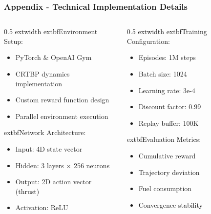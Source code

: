 \documentclass[
    11pt, %
    aspectratio=169, %
]{beamer}
\begin{document}
\begin{frame}[noframenumbering]
\label{Technical Details}
	\frametitle{Appendix - Technical Implementation Details}
	
	\begin{columns}[t]
		\begin{column}{0.5	extwidth}
				extbf{Environment Setup:}
			\begin{itemize}
				\item PyTorch \& OpenAI Gym
				\item CRTBP dynamics implementation
				\item Custom reward function design
				\item Parallel environment execution
			\end{itemize}
			
			\vspace{0.3cm}
			
				extbf{Network Architecture:}
			\begin{itemize}
				\item Input: 4D state vector
				\item Hidden: 3 layers × 256 neurons
				\item Output: 2D action vector (thrust)
				\item Activation: ReLU
			\end{itemize}
		\end{column}
		\begin{column}{0.5	extwidth}
				extbf{Training Configuration:}
			\begin{itemize}
				\item Episodes: 1M steps
				\item Batch size: 1024
				\item Learning rate: 3e-4
				\item Discount factor: 0.99
				\item Replay buffer: 100K
			\end{itemize}
			
			\vspace{0.3cm}
			
				extbf{Evaluation Metrics:}
			\begin{itemize}
				\item Cumulative reward
				\item Trajectory deviation
				\item Fuel consumption
				\item Convergence stability
			\end{itemize}
		\end{column}
	\end{columns}
\end{frame}
\end{document}
